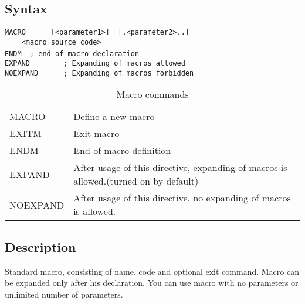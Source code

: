     \subsection{Syntax}
        {
            \usecodefont
            \verb'MACRO      [<parameter1>]  [,<parameter2>..]'\\
            \verb'    <macro source code>'\\
            \verb'ENDM  ; end of macro declaration '
            ~\\
            \usecodefont
            \verb'EXPAND        ; Expanding of macros allowed'\\
            \verb'NOEXPAND      ; Expanding of macros forbidden '\\
        }

        \begin{table}[h!]
            \begin{tabular}{|ll|}
                \hline
                MACRO      & Define a new macro \\
                EXITM      & Exit macro  \\
                ENDM       & End of macro definition \\
                EXPAND     & After usage of this directive, expanding of macros is allowed.(turned on by default)\\
                NOEXPAND   & After usage of this directive, no expanding of macros is allowed.\\
                \hline
            \end{tabular}
            \caption{Macro commands}
        \end{table}

    \subsection{Description}
        Standard macro, consisting of name, code and optional exit command. Macro can be expanded only after his declaration. You can use macro with no parameters  or unlimited number of parameters.

